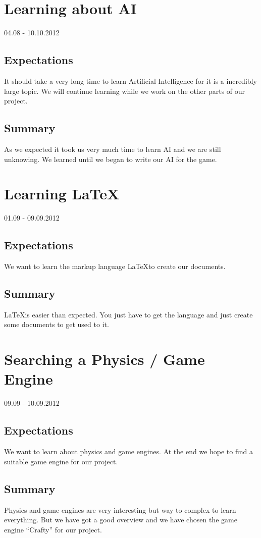 \section{Learning about AI}
04.08 - 10.10.2012
\subsection*{Expectations}
It should take a very long time to learn Artificial Intelligence for it is a incredibly large topic. We will continue learning while we work on the other parts of our project. 
\subsection*{Summary}
As we expected it took us very much time to learn AI and we are still unknowing. We learned until we began to write our AI for the game.

\section{Learning \LaTeX}
01.09 - 09.09.2012
\subsection*{Expectations}
We want to learn the markup language \LaTeX to create our documents.
\subsection*{Summary}
\LaTeX is easier than expected. You just have to get the language and just create some documents to get used to it.

\section{Searching a Physics / Game Engine}
09.09 - 10.09.2012
\subsection*{Expectations}
We want to learn about physics and game engines. At the end we hope to find a suitable game engine for our project.
\subsection*{Summary}
Physics and game engines are very interesting but way to complex to learn everything. But we have got a good overview and we have chosen the game engine ``Crafty'' for our project.

